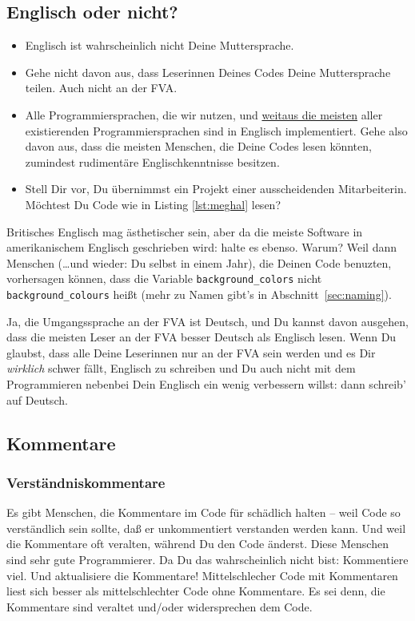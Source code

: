 \documentclass[twoside]{scrartcl}
\providecommand{\code}[1]{\texttt{#1}}
\begin{document}
\subsection{Englisch oder nicht?}
\begin{itemize}
\item Englisch ist wahrscheinlich nicht Deine Muttersprache.
\end{itemize}
\begin{itemize}
\item Gehe nicht davon aus, dass Leserinnen Deines Codes Deine
  Muttersprache teilen. Auch nicht an der FVA.
\item Alle Programmiersprachen, die wir nutzen, und
  \href{http://en.wikipedia.org/wiki/Non-English-based_programming_languages}
  {weitaus die meisten}
  aller existierenden Programmiersprachen sind in Englisch implementiert.
  Gehe also davon aus, dass die meisten Menschen, die Deine Codes lesen
  k\"o{}nnten, zumindest rudiment\"a{}re Englischkenntnisse besitzen.
\item Stell Dir vor, Du \"u{}bernimmst ein Projekt einer ausscheidenden
  Mitarbeiterin. M\"o{}chtest Du Code wie in Listing \ref{lst:meghal}
  lesen?
\end{itemize}


 Britisches Englisch mag \"a{}sthetischer sein,
aber da die meiste Software in amerikanischem Englisch geschrieben wird: halte
es ebenso. Warum? Weil dann Menschen (\ldots und wieder: Du selbst in einem
Jahr), die Deinen Code benuzten, vorhersagen k\"o{}nnen, dass die Variable
\code{background\_colors} nicht \code{background\_colours} hei\ss{}t (mehr zu
Namen gibt's in Abschnitt~\ref{sec:naming}). 

 Ja, die Umgangssprache an der FVA ist Deutsch, und Du
kannst davon ausgehen, dass die meisten Leser an der FVA besser Deutsch als
Englisch lesen. Wenn Du glaubst, dass alle Deine Leserinnen nur an der FVA
sein werden und es Dir \emph{wirklich} schwer f\"a{}llt, Englisch zu schreiben
und Du auch nicht mit dem Programmieren nebenbei Dein Englisch ein wenig
verbessern willst: dann schreib' auf Deutsch.

\subsection{Kommentare}
\subsubsection{Verst\"a{}ndniskommentare\label{sec:compcom}}
Es gibt Menschen, die Kommentare im Code f\"u{}r sch\"a{}dlich halten -- weil 
Code so verst\"a{}ndlich sein sollte, da\ss{} er unkommentiert verstanden
werden kann.
Und weil die Kommentare oft veralten, w\"a{}hrend Du den Code \"a{}nderst.
Diese Menschen sind sehr gute Programmierer.
Da Du das wahrscheinlich nicht bist:
Kommentiere viel. Und aktualisiere die Kommentare! 
Mittelschlecher Code mit Kommentaren liest sich besser als mittelschlechter  
Code ohne Kommentare. Es sei denn, die Kommentare sind veraltet und/oder 
widersprechen dem Code.
\end{document}
